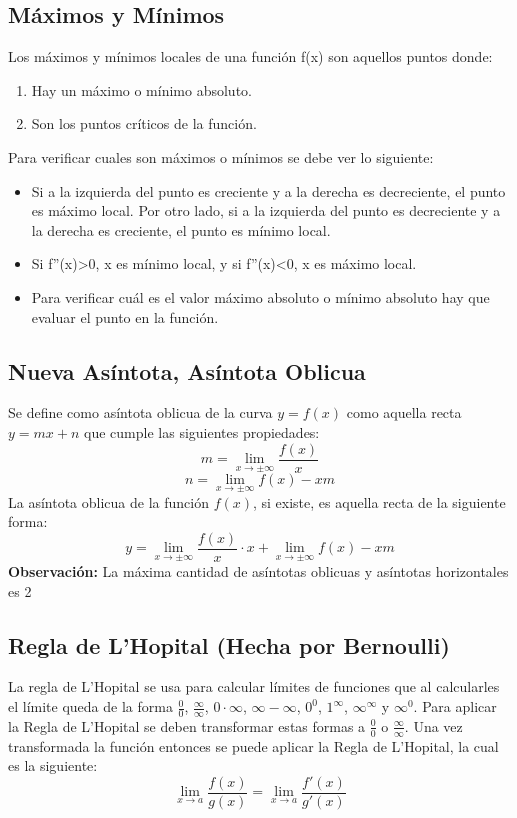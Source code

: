 \subsection*{Máximos y Mínimos}
Los máximos y mínimos locales de una función f(x) son aquellos puntos donde:
\begin{enumerate}
	\item Hay un máximo o mínimo absoluto.
	\item Son los puntos críticos de la función.
\end{enumerate}

Para verificar cuales son máximos o mínimos se debe ver lo siguiente:
\begin{itemize}
	\item Si a la izquierda del punto es creciente y a la derecha es decreciente, el punto es máximo local. Por otro lado, si a la izquierda del punto es decreciente y a la derecha es creciente, el punto es mínimo local.
	\item Si f''(x)>0, x es mínimo local, y si f''(x)<0, x es máximo local.
	\item Para verificar cuál es el valor máximo absoluto o mínimo absoluto hay que evaluar el punto en la función.
\end{itemize}
\subsection*{Nueva Asíntota, Asíntota Oblicua}
%
Se define como asíntota oblicua de la curva $y=f(x)$ como aquella recta $y=mx+n$ que cumple las siguientes propiedades:\\
$$ m = \lim_{x \to \pm\infty}\frac{f(x)}{x}$$
$$ n = \lim_{x \to \pm\infty} f(x)-xm$$
La asíntota oblicua de la función $f(x)$, si existe, es aquella recta de la siguiente forma:
\[y=\lim_{x \to \pm\infty}\frac{f(x)}{x}\cdot x + \lim_{x \to \pm\infty} f(x)-xm\]
\textbf{Observación:} La máxima cantidad de asíntotas oblicuas y asíntotas horizontales es 2
\pagebreak
\subsection*{Regla de L'Hopital (Hecha por Bernoulli)}

La regla de L'Hopital se usa para calcular límites de funciones que al calcularles el límite queda de la forma $\frac{0}{0}$, $\frac{\infty}{\infty}$, $0 \cdot \infty$, $\infty-\infty$, $0^{0}$, $1^{\infty}$, $\infty^{\infty}$ y $\infty^{0}$. Para aplicar la Regla de L'Hopital se deben transformar estas formas a $\frac{0}{0}$ o $\frac{\infty}{\infty}$. Una vez transformada la  función entonces se puede aplicar la Regla de L'Hopital, la cual es la siguiente:
\[\lim_{x\to a} \frac{f(x)}{g(x)}=\lim_{x\to a} \frac{f'(x)}{g'(x)}\]

